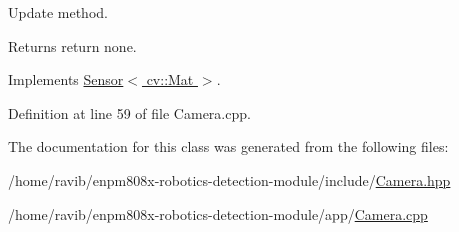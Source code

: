 Update method. 

\begin{DoxyReturn}{Returns}
return none. 
\end{DoxyReturn}


Implements \hyperlink{class_sensor_a1766329f3c9918fa886ead46b141a6a8}{Sensor$<$ cv\+::\+Mat $>$}.



Definition at line 59 of file Camera.\+cpp.



The documentation for this class was generated from the following files\+:\begin{DoxyCompactItemize}
\item 
/home/ravib/enpm808x-\/robotics-\/detection-\/module/include/\hyperlink{_camera_8hpp}{Camera.\+hpp}\item 
/home/ravib/enpm808x-\/robotics-\/detection-\/module/app/\hyperlink{_camera_8cpp}{Camera.\+cpp}\end{DoxyCompactItemize}
